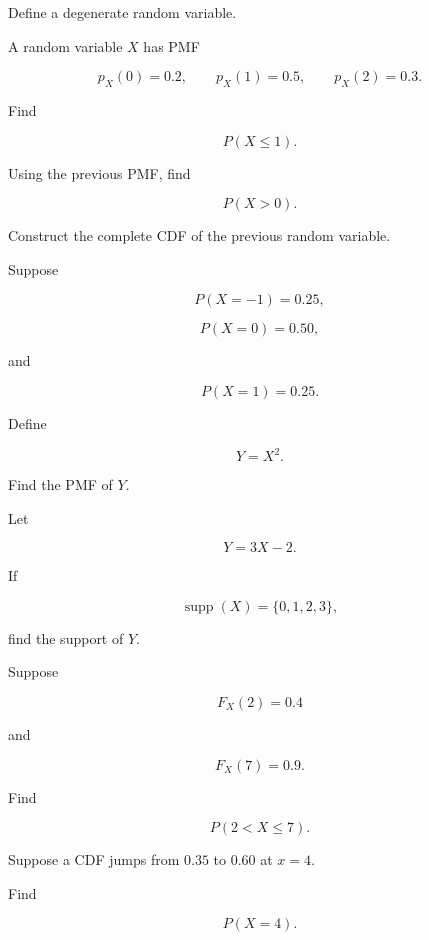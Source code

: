\begin{exercise}[1]
Define a degenerate random variable.
\end{exercise}

\begin{exercise}[2]
A random variable \(X\) has PMF

\[
p_X(0)=0.2,
\qquad
p_X(1)=0.5,
\qquad
p_X(2)=0.3.
\]

Find

\[
P(X\leq1).
\]
\end{exercise}

\begin{exercise}[2]
Using the previous PMF, find

\[
P(X>0).
\]
\end{exercise}

\begin{exercise}[2]
Construct the complete CDF of the previous random variable.
\end{exercise}

\begin{exercise}[2]
Suppose

\[
P(X=-1)=0.25,
\]

\[
P(X=0)=0.50,
\]

and

\[
P(X=1)=0.25.
\]

Define

\[
Y=X^2.
\]

Find the PMF of \(Y\).
\end{exercise}

\begin{exercise}[2]
Let

\[
Y=3X-2.
\]

If

\[
\operatorname{supp}(X)=\{0,1,2,3\},
\]

find the support of \(Y\).
\end{exercise}

\begin{exercise}[2]
Suppose

\[
F_X(2)=0.4
\]

and

\[
F_X(7)=0.9.
\]

Find

\[
P(2<X\leq7).
\]
\end{exercise}

\begin{exercise}[2]
Suppose a CDF jumps from \(0.35\) to \(0.60\) at \(x=4\).

Find

\[
P(X=4).
\]
\end{exercise}

